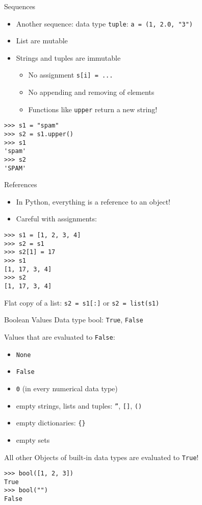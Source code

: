 \begin{frame}[fragile]{Sequences}
\begin{itemize}
\item Another sequence: data type \alert{\texttt{tuple}}: \lstinline{a = (1, 2.0, "3")}
\item List are mutable
\item Strings and tuples are immutable
\begin{itemize}
\item No assignment \lstinline{s[i] = ...}
\item No appending and removing of elements
\item Functions like \texttt{upper} return a new string!
\end{itemize}
\end{itemize}
\begin{lstlisting}[style=Shell]
>>> s1 = "spam"
>>> s2 = s1.upper()
>>> s1
'spam'
>>> s2
'SPAM'
\end{lstlisting}
\end{frame}

\begin{frame}[fragile]{References}
\begin{itemize}
\item In Python, everything is a reference to an object!
\item Careful with assignments:
\end{itemize}
\begin{lstlisting}[style=Shell]
>>> s1 = [1, 2, 3, 4]
>>> s2 = s1
>>> s2[1] = 17
>>> s1
[1, 17, 3, 4]
>>> s2
[1, 17, 3, 4]
\end{lstlisting}
Flat copy of a list: \lstinline{s2 = s1[:]} or \lstinline{s2 = list(s1)}
\end{frame}

\begin{frame}[fragile]{Boolean Values}
Data type \alert{bool}: \texttt{True}, \texttt{False}

Values that are evaluated to \texttt{False}:
\begin{itemize}
\item \texttt{None}
\item \texttt{False}
\item \texttt{0} (in every numerical data type)
\item empty strings, lists and tuples: \texttt{''}, \texttt{[]}, \texttt{()}
\item empty dictionaries: \texttt{\{\}}
\item empty sets
\end{itemize}
All other Objects of built-in data types are evaluated to \texttt{True}!
\begin{lstlisting}[style=Shell]
>>> bool([1, 2, 3])
True
>>> bool("")
False
\end{lstlisting}
\end{frame}

